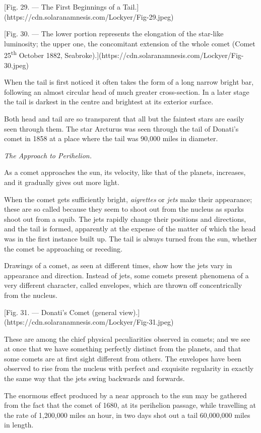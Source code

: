 \documentclass[a4paper, 12pt, oneside, polutonikogreek, english]{article}
\begin{document}
[Fig. 29. --- The First Beginnings of a Tail.](https://cdn.solaranamnesis.com/Lockyer/Fig-29.jpeg)

[Fig. 30. --- The lower portion represents the elongation of the star-like luminosity; the upper one, the concomitant extension of the whole comet (Comet 25\textsuperscript{th} October 1882, Seabroke).](https://cdn.solaranamnesis.com/Lockyer/Fig-30.jpeg)

When the tail is first noticed it often takes the form of a long narrow bright bar, following an almost circular head of much greater cross-section. In a later stage the tail is darkest in the centre and brightest at its exterior surface.

Both head and tail are so transparent that all but the faintest stars are easily seen through them. The star Arcturus was seen through the tail of Donati's comet in 1858 at a place where the tail was 90,000 miles in diameter.

\emph{The Approach to Perihelion.}

As a comet approaches the sun, its velocity, like that of the planets, increases, and it gradually gives out more light.

When the comet gets sufficiently bright, \emph{aigrettes} or \emph{jets} make their appearance; these are so called because they seem to shoot out from the nucleus as sparks shoot out from a squib. The jets rapidly change their positions and directions, and the tail is formed, apparently at the expense of the matter of which the head was in the first instance built up. The tail is always turned from the sun, whether the comet be approaching or receding.

Drawings of a comet, as seen at different times, show how the jets vary in appearance and direction. Instead of jets, some comets present phenomena of a very different character, called envelopes, which are thrown off concentrically from the nucleus.

[Fig. 31. --- Donati's Comet (general view).](https://cdn.solaranamnesis.com/Lockyer/Fig-31.jpeg)

These are among the chief physical peculiarities observed in comets; and we see at once that we have something perfectly distinct from the planets, and that some comets are at first sight different from others. The envelopes have been observed to rise from the nucleus with perfect and exquisite regularity in exactly the same way that the jets swing backwards and forwards.

The enormous effect produced by a near approach to the sun may be gathered from the fact that the comet of 1680, at its perihelion passage, while travelling at the rate of 1,200,000 miles an hour, in two days shot out a tail 60,000,000 miles in length.
\end{document}
